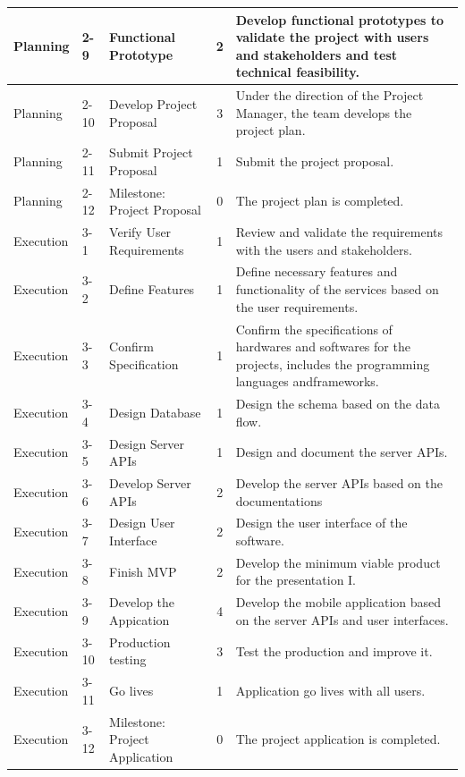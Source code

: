 \documentclass[12pt,a4paper]{article}
\begin{document}
\begin{appendices}
\begin{longtable}{p{2cm}p{1cm}p{3cm}cp{6cm}}
          Planning & 2-9 & Functional Prototype & 2 & Develop functional prototypes to validate the project with users and stakeholders and test technical feasibility.\\\hline
          Planning & 2-10 & Develop Project Proposal & 3 & Under the direction of the Project Manager, the team develops the project plan.\\\hline
          Planning & 2-11 & Submit Project Proposal & 1 & Submit the project proposal.\\\hline
          Planning & 2-12 & Milestone: Project Proposal & 0 & The project plan is completed.\\\hline
          Execution & 3-1 & Verify User Requirements & 1 & Review and validate the requirements with the users and stakeholders. \\\hline
          Execution & 3-2 & Define Features & 1 & Define necessary features and functionality of the services based on the user requirements.\\\hline
          Execution & 3-3 & Confirm Specification & 1 & Confirm the specifications of hardwares and softwares for the projects, includes the programming languages andframeworks.\\\hline
          Execution & 3-4 & Design Database  & 1 & Design the schema based on the data flow.\\\hline
          Execution & 3-5 & Design Server APIs & 1 & Design and document the server APIs.\\\hline
          Execution & 3-6 & Develop Server APIs & 2 & Develop the server APIs based on the documentations\\\hline
          Execution & 3-7 & Design User Interface  & 2 & Design the user interface of the software.\\\hline
          Execution & 3-8 & Finish MVP & 2 & Develop the minimum viable product for the presentation I.\\\hline
          Execution & 3-9 & Develop the Appication & 4 & Develop the mobile application based on the server APIs and user interfaces.\\\hline
          Execution & 3-10 & Production testing & 3 & Test the production and improve it. \\\hline
          Execution & 3-11 & Go lives & 1 & Application go lives with all users.\\\hline
          Execution & 3-12 & Milestone: Project Application & 0 & The project application is completed.\\\hline

\end{longtable}
\end{appendices}
\end{document}
